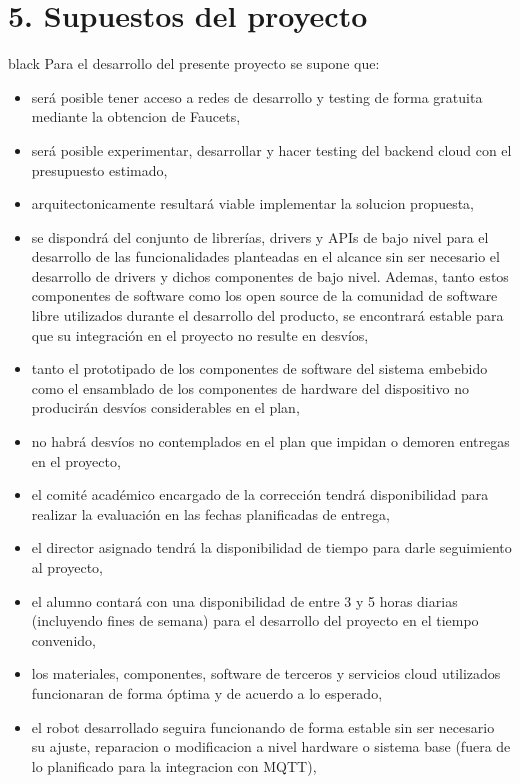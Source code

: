 \documentclass[
11pt, %
]{charter}
\begin{document}
\section{5. Supuestos del proyecto}
\label{sec:supuestos}

\begin{consigna}{black}
Para el desarrollo del presente proyecto se supone que: 

\begin{itemize}
	\item será posible tener acceso a redes de desarrollo y testing de forma gratuita mediante la obtencion de Faucets,
	\item será posible experimentar, desarrollar y hacer testing del backend cloud con el presupuesto estimado,
	\item arquitectonicamente resultará viable implementar la solucion propuesta,
	\item se dispondrá del conjunto de librerías, drivers y APIs de bajo nivel para el desarrollo de las funcionalidades planteadas en el alcance sin ser necesario el desarrollo de drivers y dichos componentes de bajo nivel. Ademas, tanto estos componentes de software como los open source de la comunidad de software libre utilizados durante el desarrollo del producto, se encontrará estable para que su integración en el proyecto no resulte en desvíos,	
	\item tanto el prototipado de los componentes de software del sistema embebido como el ensamblado de los componentes de hardware del dispositivo no producirán desvíos considerables en el plan,
	\item no habrá desvíos no contemplados en el plan que impidan o demoren entregas en el proyecto,
	\item el comité académico encargado de la corrección tendrá disponibilidad para realizar la evaluación en las fechas planificadas de entrega,
	\item el director asignado tendrá la disponibilidad de tiempo para darle seguimiento al proyecto,
	\item el alumno contará con una disponibilidad de entre 3 y 5 horas diarias (incluyendo fines de semana) para el desarrollo del proyecto en el tiempo convenido,
	\item los materiales, componentes, software de terceros y servicios cloud utilizados funcionaran de forma óptima y de acuerdo a lo esperado,
	\item el robot desarrollado seguira funcionando de forma estable sin ser necesario su ajuste, reparacion o modificacion a nivel hardware o sistema base (fuera de lo planificado para la integracion con MQTT),

\end{itemize}
\end{consigna}
\end{document}
